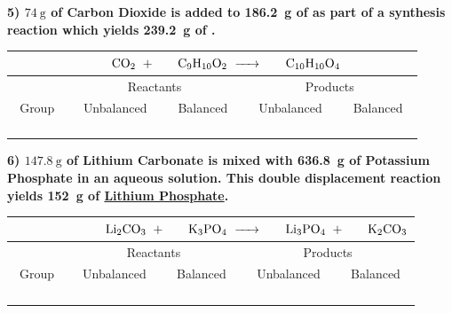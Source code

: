\documentclass[12pt, oneside, letterpaper]{book}
\begin{document}
\textbf{5) $\qty{74}{\gram}$ of Carbon Dioxide is added to \qty{186.2}{\gram} of  as part of a synthesis reaction which yields \qty{239.2}{\gram} of \underline{}.}
\begin{table}[H]
\centering
\begin{tabular}{|c||c|c||c|c|} 
 \multicolumn{5}{c}{$\phantom{Group 1234567890}
    \ce{CO2} \ + \ 
    \phantom{123} \ce{C9H10O2} \ \ce{->} \ 
    \phantom{123} \ce{C10H10O4} \ \phantom{+} \ 
    \phantom{123 \ce{CaCl2}}$} \\
 \hline
    & \multicolumn{2}{c||}{Reactants} & \multicolumn{2}{c|}{Products} \\
 \hline
 Group & Unbalanced & Balanced & Unbalanced & Balanced\\ 
 \hline\hline
   & & & & \\
 \hline
   & & & & \\
 \hline
  & & & & \\
 \hline
  & & & & \\[1ex] 
 \hline
\end{tabular}
\end{table}

\textbf{6) $\qty{147.8}{\gram}$ of Lithium Carbonate is mixed with \qty{636.8}{\gram} of Potassium Phosphate in an aqueous solution. This double displacement reaction yields \qty{152}{\gram} of \underline{Lithium Phosphate}.}
\begin{table}[H]
\centering
\begin{tabular}{|c||c|c||c|c|} 
 \multicolumn{5}{c}{$\phantom{Group 123456789}
    \ce{Li2CO3} \ + \ 
    \phantom{123} \ce{K3PO4} \ \ce{->} \ 
    \phantom{123} \ce{Li3PO4} \ + \ 
    \phantom{123} \ce{K2CO3}$} \\
 \hline
    & \multicolumn{2}{c||}{Reactants} & \multicolumn{2}{c|}{Products} \\
 \hline
 Group & Unbalanced & Balanced & Unbalanced & Balanced\\ 
 \hline\hline
   & & & & \\
 \hline
   & & & & \\
 \hline
  & & & & \\
 \hline
  & & & & \\[1ex] 
 \hline
\end{tabular}
\end{table}
\end{document}
